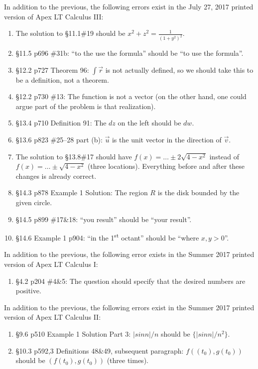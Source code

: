 \documentclass{amsart}
\newcommand{\ds}{\displaystyle}
\begin{document}
In addition to the previous, the following errors exist in the July 27, 2017 printed version of Apex LT Calculus III:
\begin{enumerate}
\item The solution to \S11.1\#19 should be $x^2+z^2=\frac1{(1+y^2)^2}$.
\item \S11.5 p696 \#31b: ``to the use the formula'' should be ``to use the formula''.
\item \S12.2 p727 Theorem 96: $\ds\int\vec r$ is not actually defined, so we should take this to be a definition, not a theorem.
\item \S12.2 p730 \#13: The function is not a vector (on the other hand, one could argue part of the problem is that realization).
\item \S13.4 p710 Definition 91: The $dz$ on the left should be $dw$.
\item \S13.6 p823 \#25--28 part (b): $\vec u$ is the unit vector in the direction of $\vec v$.
\item The solution to \S13.8\#17 should have $f(x)=\dots\pm2\sqrt{4-x^2}$ instead of $f(x)=\dots\pm\sqrt{4-x^2}$ (three locations).  Everything before and after these changes is already correct.
\item \S14.3 p878 Example 1 Solution: The region $R$ is the disk bounded by the given circle.
\item \S14.5 p899 \#17\&18: ``you result'' should be ``your result''.
\item \S14.6 Example 1 p904: ``in the 1\textsuperscript{st} octant'' should be ``where $x,y>0$''.
\label{2017-07-27III}
\end{enumerate}

\clearpage

In addition to the previous, the following error exists in the Summer 2017 printed version of Apex LT Calculus I:
\begin{enumerate}
\item \S4.2 p204 \#4\&5: The question should specify that the desired numbers are positive.
\label{2017-05-00I}
\end{enumerate}
\vspace{1in}

In addition to the previous, the following errors exist in the Summer 2017 printed version of Apex LT Calculus II:
\begin{enumerate}
\item \S9.6 p510 Example 1 Solution Part 3: $|sin n|/n$ should be $\{|sin n|/n^2\}$.
\item \S10.3 p592,3 Definitions 48\&49, subsequent paragraph: $f((t_0), g(t_0))$ should be $(f(t_0), g(t_0))$ (three times).
\label{2017-05-00II}
\end{enumerate}
\end{document}
